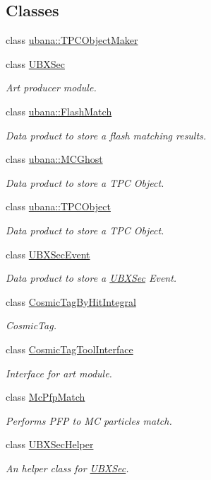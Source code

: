 \subsection*{Classes}
\begin{DoxyCompactItemize}
\item 
class \hyperlink{classubana_1_1TPCObjectMaker}{ubana\-::\-T\-P\-C\-Object\-Maker}
\item 
class \hyperlink{classUBXSec}{U\-B\-X\-Sec}
\begin{DoxyCompactList}\small\item\em Art producer module. \end{DoxyCompactList}\item 
class \hyperlink{classubana_1_1FlashMatch}{ubana\-::\-Flash\-Match}
\begin{DoxyCompactList}\small\item\em Data product to store a flash matching results. \end{DoxyCompactList}\item 
class \hyperlink{classubana_1_1MCGhost}{ubana\-::\-M\-C\-Ghost}
\begin{DoxyCompactList}\small\item\em Data product to store a T\-P\-C Object. \end{DoxyCompactList}\item 
class \hyperlink{classubana_1_1TPCObject}{ubana\-::\-T\-P\-C\-Object}
\begin{DoxyCompactList}\small\item\em Data product to store a T\-P\-C Object. \end{DoxyCompactList}\item 
class \hyperlink{classUBXSecEvent}{U\-B\-X\-Sec\-Event}
\begin{DoxyCompactList}\small\item\em Data product to store a \hyperlink{classUBXSec}{U\-B\-X\-Sec} Event. \end{DoxyCompactList}\item 
class \hyperlink{classCosmicTagByHitIntegral}{Cosmic\-Tag\-By\-Hit\-Integral}
\begin{DoxyCompactList}\small\item\em Cosmic\-Tag. \end{DoxyCompactList}\item 
class \hyperlink{classCosmicTagToolInterface}{Cosmic\-Tag\-Tool\-Interface}
\begin{DoxyCompactList}\small\item\em Interface for art module. \end{DoxyCompactList}\item 
class \hyperlink{classMcPfpMatch}{Mc\-Pfp\-Match}
\begin{DoxyCompactList}\small\item\em Performs P\-F\-P to M\-C particles match. \end{DoxyCompactList}\item 
class \hyperlink{classUBXSecHelper}{U\-B\-X\-Sec\-Helper}
\begin{DoxyCompactList}\small\item\em An helper class for \hyperlink{classUBXSec}{U\-B\-X\-Sec}. \end{DoxyCompactList}\end{DoxyCompactItemize}
